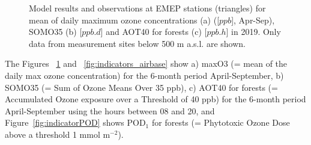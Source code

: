 \begin{figure}[H]
  \centering
\caption{Model results and observations at EMEP stations (triangles) for mean of daily maximum ozone concentrations (a) ([$ppb$], Apr-Sep), SOMO35 (b) [$ppb.d$] and AOT40 for forests (c) [$ppb.h$] in 2019. Only data from measurement sites below 500 m a.s.l. are shown.}
\label{fig:indicators_emep}
\end{figure}

The Figures ~\ref{fig:indicators_emep} and ~\ref{fig:indicators_airbase} show a) maxO3 (= mean of the daily max ozone concentration) for the 6-month period April-September, b) SOMO35 (= Sum of Ozone Means Over 35 ppb), c) AOT40 for forests (= Accumulated Ozone exposure over a Threshold of 40 ppb) for the 6-month period April-September using the hours between 08 and 20, and Figure~\ref{fig:indicatorPOD} shows POD$_1$ for forests (= Phytotoxic Ozone Dose above a threshold 1 mmol m$^{-2}$). 

